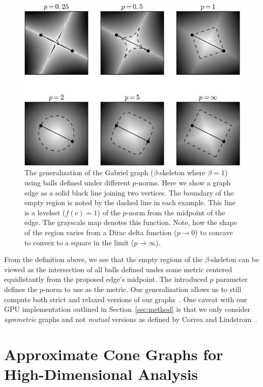 \begin{figure}
    \includegraphics[width=\linewidth]{figs/chap7/emptyRegions}
    \caption{The generalization of the Gabriel graph ($\beta$-skeleton where $\beta=1$) using balls defined under different $p$-norms.
    Here we show a graph edge as a solid black line joining two vertices.
    The boundary of the empty region is noted by the dashed line in each example.
    This line is a levelset ($f(c)=1$) of the $p$-norm from the midpoint of the edge.
    The grayscale map denotes this function.
    Note, how the shape of the region varies from a Dirac delta function ($p \rightarrow 0$) to concave to convex to a square in the limit ($p \rightarrow \infty$).}
    \label{fig:gabriel_p_shapes}
\end{figure}

From the definition above, we see that the empty regions of the $\beta$-skeleton can be viewed as the intersection of all balls defined under some metric centered equidistantly from the proposed edge's midpoint.
%
The introduced $p$ parameter defines the $p$-norm to use as the metric.
%
Our generalization allows us to still compute both strict and relaxed versions of our graphs~\cite{CorreaLindstrom2011}.
%
One caveat with our GPU implementation outlined in Section~\ref{sec:method} is that we only consider \textit{symmetric} graphs and not \textit{mutual} versions as defined by Correa and Lindstrom~\cite{CorreaLindstrom2011}.

\section{Approximate Cone Graphs for High-Dimensional Analysis}


